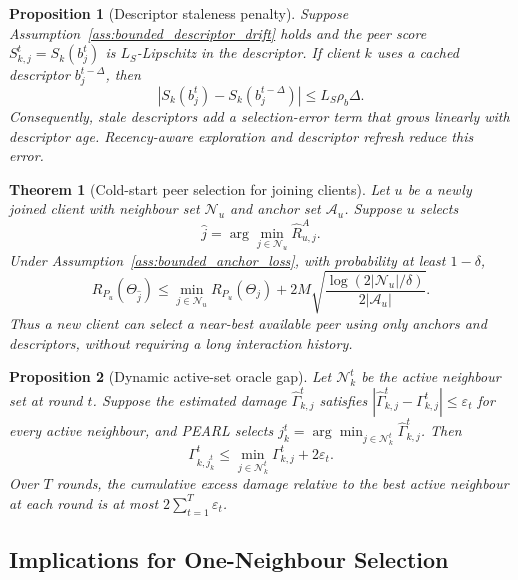 \documentclass[conference]{IEEEtran}
\newtheorem{proposition}{Proposition}
\newtheorem{theorem}{Theorem}
\begin{document}
\begin{proposition}[Descriptor staleness penalty]
\label{prop:descriptor_staleness_penalty}
Suppose Assumption~\ref{ass:bounded_descriptor_drift} holds and the peer score \(S_{k,j}^t=S_k(b_j^t)\) is \(L_S\)-Lipschitz in the descriptor. If client \(k\) uses a cached descriptor \(b_j^{t-\Delta}\), then
\begin{equation*}
|S_k(b_j^t)-S_k(b_j^{t-\Delta})|
\leq
L_S\rho_b\Delta .
\end{equation*}
Consequently, stale descriptors add a selection-error term that grows linearly with descriptor age. Recency-aware exploration and descriptor refresh reduce this error.
\end{proposition}

\begin{theorem}[Cold-start peer selection for joining clients]
\label{thm:cold_start_peer_selection}
Let \(u\) be a newly joined client with neighbour set \(\mathcal{N}_u\) and anchor set \(\mathcal{A}_u\). Suppose \(u\) selects
\[
\hat{j}
=
\arg\min_{j\in\mathcal{N}_u}
\widehat{R}_{u,j}^{A}.
\]
Under Assumption~\ref{ass:bounded_anchor_loss}, with probability at least \(1-\delta\),
\begin{equation*}
R_{P_u}(\Theta_{\hat{j}})
\leq
\min_{j\in\mathcal{N}_u}
R_{P_u}(\Theta_j)
+
2M
\sqrt{
\frac{\log(2|\mathcal{N}_u|/\delta)}
{2|\mathcal{A}_u|}
}.
\end{equation*}
Thus a new client can select a near-best available peer using only anchors and descriptors, without requiring a long interaction history.
\end{theorem}

\begin{proposition}[Dynamic active-set oracle gap]
\label{prop:dynamic_active_oracle_gap}
Let \(\mathcal{N}_k^t\) be the active neighbour set at round \(t\). Suppose the estimated damage \(\widehat{\Gamma}_{k,j}^t\) satisfies \(|\widehat{\Gamma}_{k,j}^t-\Gamma_{k,j}^t|\leq\varepsilon_t\) for every active neighbour, and PEARL selects \(j_k^t=\arg\min_{j\in\mathcal{N}_k^t}\widehat{\Gamma}_{k,j}^t\). Then
\begin{equation*}
\Gamma_{k,j_k^t}^t
\leq
\min_{j\in\mathcal{N}_k^t}\Gamma_{k,j}^t
+2\varepsilon_t .
\end{equation*}
Over \(T\) rounds, the cumulative excess damage relative to the best active neighbour at each round is at most \(2\sum_{t=1}^T\varepsilon_t\).
\end{proposition}

\subsection{Implications for One-Neighbour Selection}
\label{subsec:implications-for-one-neighbour-selection}
\end{document}
